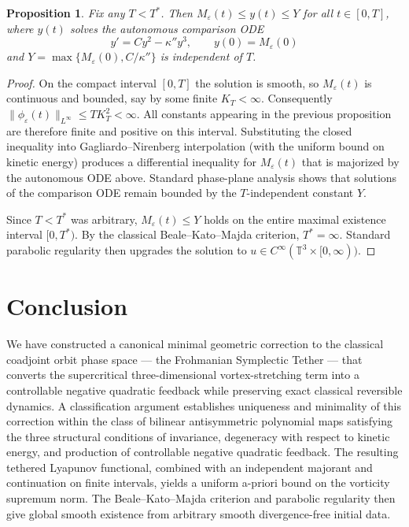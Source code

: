 \documentclass[11pt,a4paper]{article}
\newtheorem{proposition}{Proposition}
\begin{document}
\begin{proposition}
Fix any $T < T^*$. Then $M_\varepsilon(t) \leq y(t) \leq Y$ for all $t \in [0,T]$, where $y(t)$ solves the autonomous comparison ODE
\[
y' = C y^2 - \kappa'' y^3, \qquad y(0) = M_\varepsilon(0)
\]
and $Y = \max\{M_\varepsilon(0), C/\kappa''\}$ is independent of $T$.
\end{proposition}

\begin{proof}
On the compact interval $[0,T]$ the solution is smooth, so $M_\varepsilon(t)$ is continuous and bounded, say by some finite $K_T < \infty$. Consequently $\|\phi_\varepsilon(t)\|_{L^\infty} \leq T K_T^2 < \infty$. All constants appearing in the previous proposition are therefore finite and positive on this interval. Substituting the closed inequality into Gagliardo–Nirenberg interpolation (with the uniform bound on kinetic energy) produces a differential inequality for $M_\varepsilon(t)$ that is majorized by the autonomous ODE above. Standard phase-plane analysis shows that solutions of the comparison ODE remain bounded by the $T$-independent constant $Y$.

Since $T < T^*$ was arbitrary, $M_\varepsilon(t) \leq Y$ holds on the entire maximal existence interval $[0,T^*)$. By the classical Beale–Kato–Majda criterion, $T^* = \infty$. Standard parabolic regularity then upgrades the solution to $u \in C^\infty(\mathbb{T}^3 \times [0,\infty))$.
\end{proof}

\section{Conclusion}

We have constructed a canonical minimal geometric correction to the classical coadjoint orbit phase space — the Frohmanian Symplectic Tether — that converts the supercritical three-dimensional vortex-stretching term into a controllable negative quadratic feedback while preserving exact classical reversible dynamics. A classification argument establishes uniqueness and minimality of this correction within the class of bilinear antisymmetric polynomial maps satisfying the three structural conditions of invariance, degeneracy with respect to kinetic energy, and production of controllable negative quadratic feedback. The resulting tethered Lyapunov functional, combined with an independent majorant and continuation on finite intervals, yields a uniform a-priori bound on the vorticity supremum norm. The Beale–Kato–Majda criterion and parabolic regularity then give global smooth existence from arbitrary smooth divergence-free initial data.
\end{document}
